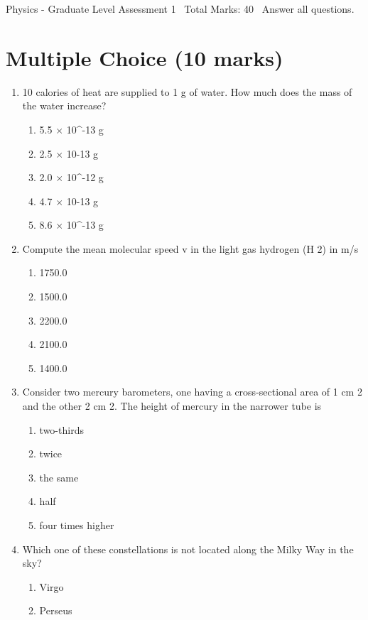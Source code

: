 \documentclass[12pt]{article}
\begin{document}
\begin{center}
Physics - Graduate Level Assessment 1 \
Total Marks: 40 \
Answer all questions.
\end{center}

\section*{Multiple Choice (10 marks)}
\begin{enumerate}[label=\arabic*.]
\item 10 calories of heat are supplied to 1 g of water. How much does the mass of the water increase?
\begin{enumerate}[label=(\alph*)]
    \item 5.5 \ensuremath{\times} 10^-13 g
    \item 2.5 \ensuremath{\times} 10-13 g
    \item 2.0 \ensuremath{\times} 10^-12 g
    \item 4.7 \ensuremath{\times} 10-13 g
    \item 8.6 \ensuremath{\times} 10^-13 g
\end{enumerate}
\item Compute the mean molecular speed v in the light gas hydrogen (H 2) in m/s
\begin{enumerate}[label=(\alph*)]
    \item 1750.0
    \item 1500.0
    \item 2200.0
    \item 2100.0
    \item 1400.0
\end{enumerate}
\item Consider two mercury barometers, one having a cross-sectional area of 1 cm 2 and the other 2 cm 2. The height of mercury in the narrower tube is
\begin{enumerate}[label=(\alph*)]
    \item two-thirds
    \item twice
    \item the same
    \item half
    \item four times higher
\end{enumerate}
\item Which one of these constellations is not located along the Milky Way in the sky?
\begin{enumerate}[label=(\alph*)]
    \item Virgo
    \item Perseus

\end{enumerate}
\end{enumerate}
\end{document}
